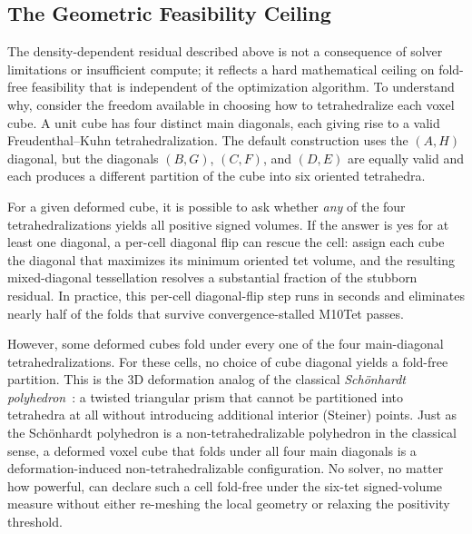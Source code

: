 \documentclass[lettersize,journal]{IEEEtran}
\begin{document}
\begin{table}[ht]\centering
\caption{TODO (deferred): Strict-feasibility and geometric ceiling results across fold-density regimes. Rows: sparse, moderate, and dense bands of the B0039 volume. Columns: initial fold count, post-Stage-1 fold count, post-Stage-2+3 fold count, minimum oriented tet volume, total wall time.}
\label{tab:strict_feas_3d}
\end{table}

\subsection{The Geometric Feasibility Ceiling}
\label{sec:geometric_ceiling}

The density-dependent residual described above is not a consequence of solver limitations or insufficient compute; it reflects a hard mathematical ceiling on fold-free feasibility that is independent of the optimization algorithm. To understand why, consider the freedom available in choosing how to tetrahedralize each voxel cube. A unit cube has four distinct main diagonals, each giving rise to a valid Freudenthal--Kuhn tetrahedralization. The default construction uses the $(A, H)$ diagonal, but the diagonals $(B, G)$, $(C, F)$, and $(D, E)$ are equally valid and each produces a different partition of the cube into six oriented tetrahedra.

For a given deformed cube, it is possible to ask whether \emph{any} of the four tetrahedralizations yields all positive signed volumes. If the answer is yes for at least one diagonal, a per-cell diagonal flip can rescue the cell: assign each cube the diagonal that maximizes its minimum oriented tet volume, and the resulting mixed-diagonal tessellation resolves a substantial fraction of the stubborn residual. In practice, this per-cell diagonal-flip step runs in seconds and eliminates nearly half of the folds that survive convergence-stalled M10Tet passes.

However, some deformed cubes fold under every one of the four main-diagonal tetrahedralizations. For these cells, no choice of cube diagonal yields a fold-free partition. This is the 3D deformation analog of the classical \emph{Sch\"onhardt polyhedron}~\cite{schonhardt1928}: a twisted triangular prism that cannot be partitioned into tetrahedra at all without introducing additional interior (Steiner) points. Just as the Sch\"onhardt polyhedron is a non-tetrahedralizable polyhedron in the classical sense, a deformed voxel cube that folds under all four main diagonals is a deformation-induced non-tetrahedralizable configuration. No solver, no matter how powerful, can declare such a cell fold-free under the six-tet signed-volume measure without either re-meshing the local geometry or relaxing the positivity threshold.
\end{document}
